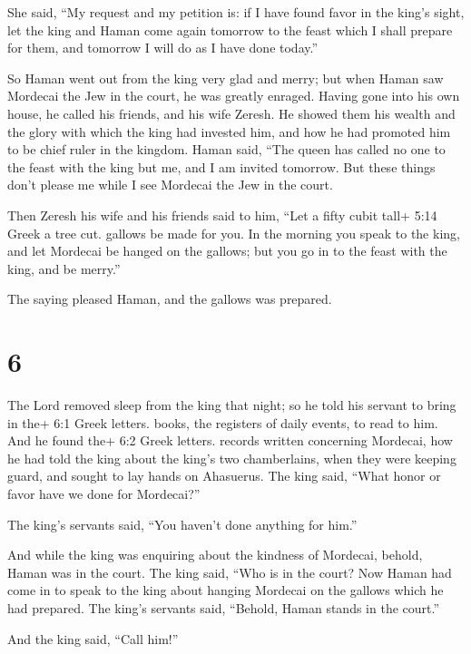 She said, ``My request and my petition is:  if
I have found favor in the king's sight, let the king and Haman come
again tomorrow to the feast which I shall prepare for them, and tomorrow
I will do as I have done today.''

 So Haman went out from the king very glad and merry; but
when Haman saw Mordecai the Jew in the court, he was greatly enraged.
 Having gone into his own house, he called his friends, and
his wife Zeresh.  He showed them his wealth and the glory
with which the king had invested him, and how he had promoted him to be
chief ruler in the kingdom.  Haman said, ``The queen has
called no one to the feast with the king but me, and I am invited
tomorrow.  But these things don't please me while I see
Mordecai the Jew in the court.

 Then Zeresh his wife and his friends said to him, ``Let a
fifty cubit tall+ 5:14 Greek a tree cut. gallows be made for you. In the
morning you speak to the king, and let Mordecai be hanged on the
gallows; but you go in to the feast with the king, and be merry.''

The saying pleased Haman, and the gallows was prepared.

\hypertarget{section-5}{%
\section{6}\label{section-5}}

 The Lord removed sleep from the king that night; so he told
his servant to bring in the+ 6:1 Greek letters. books, the registers of
daily events, to read to him.  And he found the+ 6:2 Greek
letters. records written concerning Mordecai, how he had told the king
about the king's two chamberlains, when they were keeping guard, and
sought to lay hands on Ahasuerus.  The king said, ``What
honor or favor have we done for Mordecai?''

The king's servants said, ``You haven't done anything for him.''

 And while the king was enquiring about the kindness of
Mordecai, behold, Haman was in the court. The king said, ``Who is in the
court? Now Haman had come in to speak to the king about hanging Mordecai
on the gallows which he had prepared.  The king's servants
said, ``Behold, Haman stands in the court.''

And the king said, ``Call him!''

